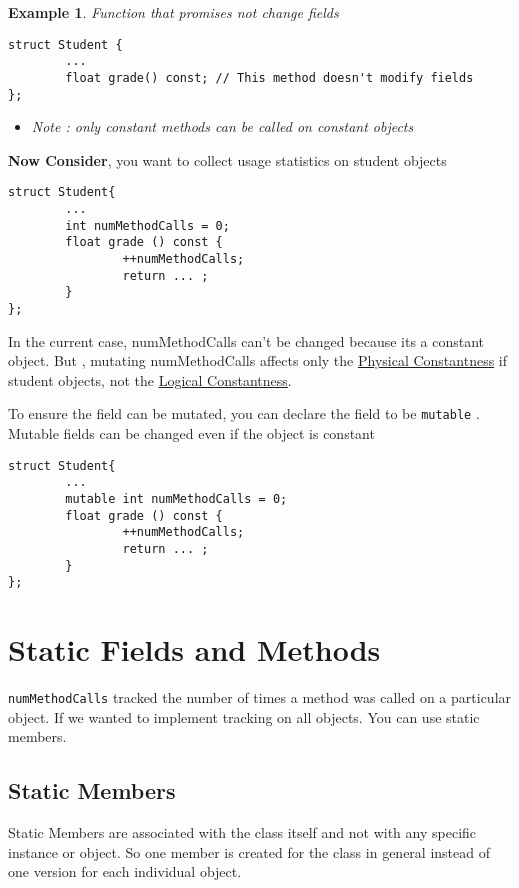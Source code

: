 \documentclass{article}
\newtheorem{ex}[theorem]{Example}
\begin{document}
\begin{ex} Function that promises not change fields
\begin{lstlisting}
struct Student {
		...
		float grade() const; // This method doesn't modify fields
};
\end{lstlisting}
\begin{itemize}
\item Note : only constant methods can be called on constant objects
\end{itemize}
\end{ex}

\textbf{Now Consider}, you want to collect usage statistics on student objects

\begin{lstlisting}
struct Student{
		...
		int numMethodCalls = 0;
		float grade () const {
				++numMethodCalls;
				return ... ;
		}
};
\end{lstlisting}

In the current case, numMethodCalls can't be changed because its a constant object. But , mutating numMethodCalls affects only the \underline{Physical Constantness} if student objects, not the \underline{Logical Constantness}.

To ensure the field can be mutated, you can declare the field to be \verb|mutable| .  Mutable fields can be changed even if the object is constant

\begin{lstlisting}
struct Student{
		...
		mutable int numMethodCalls = 0;
		float grade () const {
				++numMethodCalls;
				return ... ;
		}
};
\end{lstlisting}

\section{Static Fields and Methods}

\verb|numMethodCalls| tracked the number of times a method was called on a particular object. If we wanted to implement tracking on all objects. You can use static members.

\subsection{Static Members}
Static Members are associated with the class itself and not with any specific instance or object. So one member is created for the class in general instead of one version for each individual object.
\end{document}
